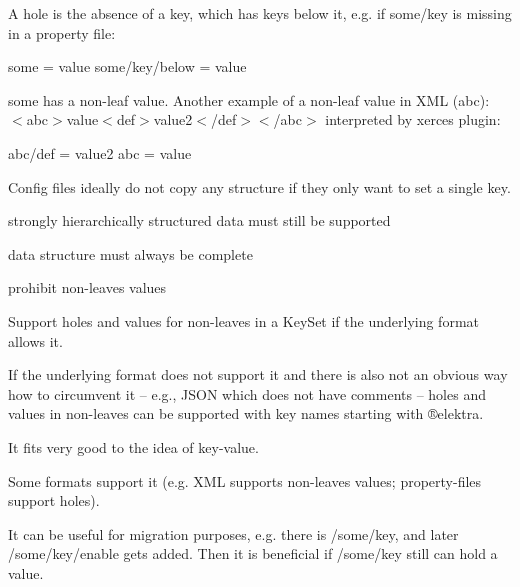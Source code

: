 A hole is the absence of a key, which has keys below it, e.\+g. if {\ttfamily some/key} is missing in a property file\+:


\begin{DoxyCode}
some = value
some/key/below = value
\end{DoxyCode}


{\ttfamily some} has a non-\/leaf value. Another example of a non-\/leaf value in X\+ML ({\ttfamily abc})\+: {\ttfamily $<$abc$>$value$<$def$>$value2$<$/def$>$$<$/abc$>$} interpreted by xerces plugin\+:


\begin{DoxyCode}
abc/def = value2
abc = value
\end{DoxyCode}


Config files ideally do not copy any structure if they only want to set a single key.


\begin{DoxyItemize}
\item strongly hierarchically structured data must still be supported
\end{DoxyItemize}


\begin{DoxyItemize}
\item data structure must always be complete
\item prohibit non-\/leaves values
\end{DoxyItemize}

Support holes and values for non-\/leaves in a Key\+Set if the underlying format allows it.

If the underlying format does not support it and there is also not an obvious way how to circumvent it -- e.\+g., J\+S\+ON which does not have comments -- holes and values in non-\/leaves can be supported with key names starting with ®elektra.


\begin{DoxyItemize}
\item It fits very good to the idea of key-\/value.
\item Some formats support it (e.\+g. X\+ML supports non-\/leaves values; property-\/files support holes).
\item It can be useful for migration purposes, e.\+g. there is {\ttfamily /some/key}, and later {\ttfamily /some/key/enable} gets added. Then it is beneficial if {\ttfamily /some/key} still can hold a value.
\end{DoxyItemize}